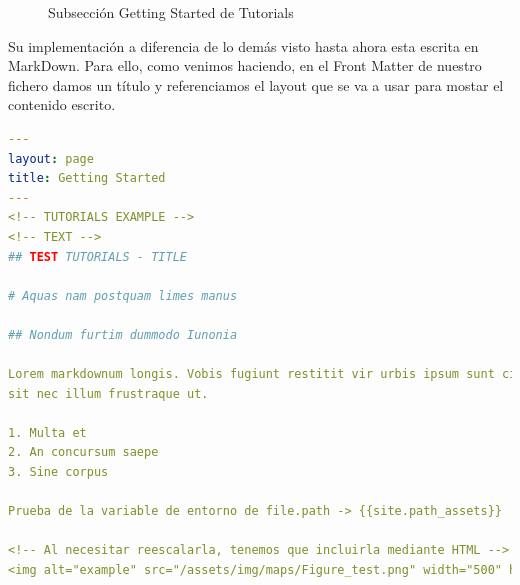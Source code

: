 \begin{figure}[H]
    \centering
    \caption{Subsección Getting Started de Tutorials }
    \label{fig:gettinWeb}
\end{figure}

Su implementación a diferencia de lo demás visto hasta ahora esta escrita en MarkDown. Para ello, como venimos haciendo, en el Front Matter de nuestro fichero damos un título y referenciamos el layout que se va a usar para mostar el contenido escrito. 

\begin{lstlisting}[language=yaml,caption=getting\_started.md,label={code:gettingMark}]
  ---
layout: page
title: Getting Started
---
<!-- TUTORIALS EXAMPLE -->
<!-- TEXT -->
## TEST TUTORIALS - TITLE

# Aquas nam postquam limes manus

## Nondum furtim dummodo Iunonia

Lorem markdownum longis. Vobis fugiunt restitit vir urbis ipsum sunt circuiere
sit nec illum frustraque ut.

1. Multa et
2. An concursum saepe
3. Sine corpus

Prueba de la variable de entorno de file.path -> {{site.path_assets}}

<!-- Al necesitar reescalarla, tenemos que incluirla mediante HTML -->
<img alt="example" src="/assets/img/maps/Figure_test.png" width="500" height="200">
\end{lstlisting}

